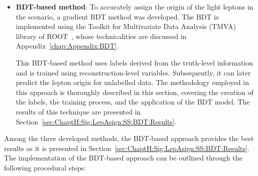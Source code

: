 \begin{itemize}
	
	\item \textbf{BDT-based method}: To accurately assign the origin of the light leptons 
	in the \dilepSStau scenario, a gradient BDT method was developed. The BDT is 
	implemented using the Toolkit for Multivariate Data Analysis (TMVA) library of 
	ROOT~\cite{Brun:1997pa, TMVAUsersGuide}, whose technicalities are discussed 
	in Appendix~\ref{chap:Appendix:BDT}.
	
	This BDT-based method uses labels derived from the truth-level information and is 
	trained using reconstruction-level variables. Subsequently, it can later predict the 
	lepton origin for unlabelled data. The methodology employed in this approach is
	thoroughly described in this section, covering the creation of the labels, the training 
	process, and the application of the BDT model. 	
	The results of this technique are presented in Section~\ref{sec:ChaptH:Sig:LepAsign:SS:BDT:Results}.


\end{itemize}

Among the three developed methods, the BDT-based approach provides the
best results as it is presented in Section~\ref{sec:ChaptH:Sig:LepAsign:SS:BDT:Results}. 
The implementation of the BDT-based approach can be outlined 
through the following procedural steps:

